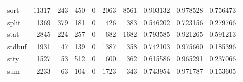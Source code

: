 \begin{tabular}{lrrrrrrrrr}
sort      &                                              11317 &                                                243 &                                                450 &                                                  0 &                                               2063 &                                               8561 &                                           0.903132 &                               0.978528 &                             0.756473 \\
split     &                                               1369 &                                                379 &                                                181 &                                                  0 &                                                426 &                                                383 &                                           0.546202 &                               0.723156 &                             0.279766 \\
stat      &                                               2845 &                                                224 &                                                257 &                                                  0 &                                                682 &                                               1682 &                                           0.793585 &                               0.921265 &                             0.591213 \\
stdbuf    &                                               1931 &                                                 47 &                                                139 &                                                  0 &                                               1387 &                                                358 &                                           0.742103 &                               0.975660 &                             0.185396 \\
stty      &                                               1527 &                                                 53 &                                                512 &                                                  0 &                                                600 &                                                362 &                                           0.615586 &                               0.965291 &                             0.237066 \\
sum       &                                               2233 &                                                 63 &                                                104 &                                                  0 &                                               1723 &                                                343 &                                           0.743954 &                               0.971787 &                             0.153605 \\

\end{tabular}
